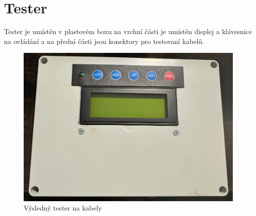 
\section{Tester}
Tester je umístěn v plastovém boxu na vrchní části je umístěn displej a klávesnice na ovládání a na přední části jsou konektory pro testovaní kabelů.
\begin{figure}[h!]
	\centering
	\includegraphics[width=\textwidth]{pictures/tester-top.jpeg}
    	\caption{Výsledný tester na kabely}
   	\label{fig:tester}
\end{figure}

